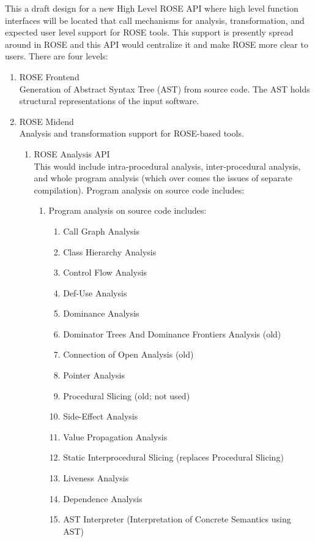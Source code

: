 This a draft design for a new High Level ROSE API where high level function interfaces will be
located that call mechanisms for analysis, transformation, and expected user level support
for ROSE tools. This support is presently spread around in ROSE and this API would
centralize it and make ROSE more clear to users.
There are four levels:
\begin{enumerate}
   \item ROSE Frontend \\
      Generation of Abstract Syntax Tree (AST) from source code.
      The AST holds structural representations of the input software.

   \item ROSE Midend \\
      Analysis and transformation support for ROSE-based tools.
   \begin{enumerate}
      \item ROSE Analysis API \\
         This would include intra-procedural analysis, inter-procedural analysis, 
         and whole program analysis (which over comes the issues of separate compilation).
         Program analysis on source code includes:
         \begin{enumerate}
            \item Program analysis on source code includes:
            \begin{enumerate}
               \item Call Graph Analysis
               \item Class Hierarchy Analysis
               \item Control Flow Analysis
               \item Def-Use Analysis
               \item Dominance Analysis
               \item Dominator Trees And Dominance Frontiers Analysis (old)
               \item Connection of Open Analysis (old)
               \item Pointer Analysis
               \item Procedural Slicing (old; not used) 
               \item Side-Effect Analysis
               \item Value Propagation Analysis
               \item Static Interprocedural Slicing (replaces Procedural Slicing)
               \item Liveness Analysis
               \item Dependence Analysis
               \item AST Interpreter (Interpretation of Concrete Semantics using AST)
            \end{enumerate}
         \end{enumerate}


\end{enumerate}
\end{enumerate}
